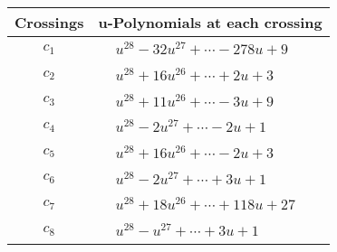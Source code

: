 \documentclass[1p]{elsarticle_modified}
\theoremstyle{definition}
\begin{document}
\begin{tabular}{m{50pt}|m{274pt}}
Crossings & \hspace{64pt}u-Polynomials at each crossing \\
\hline $$\begin{aligned}c_{1}\end{aligned}$$&$\begin{aligned}
&u^{28}-32 u^{27}+\cdots-278 u+9
\end{aligned}$\\
\hline $$\begin{aligned}c_{2}\end{aligned}$$&$\begin{aligned}
&u^{28}+16 u^{26}+\cdots+2 u+3
\end{aligned}$\\
\hline $$\begin{aligned}c_{3}\end{aligned}$$&$\begin{aligned}
&u^{28}+11 u^{26}+\cdots-3 u+9
\end{aligned}$\\
\hline $$\begin{aligned}c_{4}\end{aligned}$$&$\begin{aligned}
&u^{28}-2 u^{27}+\cdots-2 u+1
\end{aligned}$\\
\hline $$\begin{aligned}c_{5}\end{aligned}$$&$\begin{aligned}
&u^{28}+16 u^{26}+\cdots-2 u+3
\end{aligned}$\\
\hline $$\begin{aligned}c_{6}\end{aligned}$$&$\begin{aligned}
&u^{28}-2 u^{27}+\cdots+3 u+1
\end{aligned}$\\
\hline $$\begin{aligned}c_{7}\end{aligned}$$&$\begin{aligned}
&u^{28}+18 u^{26}+\cdots+118 u+27
\end{aligned}$\\
\hline $$\begin{aligned}c_{8}\end{aligned}$$&$\begin{aligned}
&u^{28}- u^{27}+\cdots+3 u+1
\end{aligned}$\\

\end{tabular}
\end{document}
